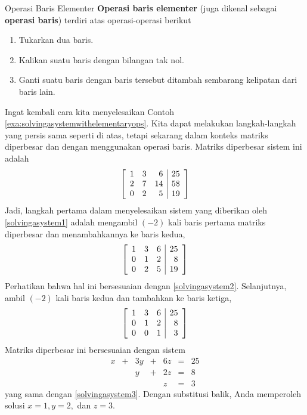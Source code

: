 \begin{definition}{Operasi Baris Elementer}\label{def:rowoperations}
\textbf{Operasi baris elementer} (juga dikenal sebagai \textbf{operasi baris}) terdiri atas operasi-operasi berikut  

\begin{enumerate}
\item Tukarkan dua baris.

\item Kalikan suatu baris dengan bilangan tak nol.

\item Ganti suatu baris dengan baris tersebut ditambah sembarang kelipatan dari baris lain.
\end{enumerate}
\end{definition}

Ingat kembali cara kita menyelesaikan Contoh \ref{exa:solvingasystemwithelementaryops}.
Kita dapat melakukan langkah-langkah yang persis sama seperti di atas, tetapi sekarang dalam konteks matriks diperbesar dan dengan menggunakan operasi baris.
Matriks diperbesar sistem ini adalah
\begin{equation*}
\left[ 
\begin{array}{rrr|r}
1 & 3 & 6 &  25 \\
2 & 7 & 14 &  58 \\
0 & 2 & 5 &  19
\end{array}
\right] 
\end{equation*}
Jadi, langkah pertama dalam
menyelesaikan sistem yang diberikan oleh \ref{solvingasystem1} adalah mengambil $\left( -2\right) $ kali baris pertama
matriks diperbesar dan menambahkannya ke baris kedua,
\begin{equation*}
\left[
\begin{array}{rrr|r}
1 & 3 & 6 & 25 \\
0 & 1 & 2 & 8 \\
0 & 2 & 5 & 19
\end{array}
\right] 
\end{equation*}
Perhatikan bahwa hal ini bersesuaian dengan \ref{solvingasystem2}. Selanjutnya, ambil $\left( -2\right) $
kali baris kedua dan tambahkan ke baris ketiga,
\begin{equation*}
\left[ 
\begin{array}{rrr|r}
1 & 3 & 6 & 25 \\
0 & 1 & 2 & 8 \\
0 & 0 & 1 & 3
\end{array}
\right]
\end{equation*}
Matriks diperbesar ini bersesuaian dengan sistem
\begin{equation*}
\begin{array}{ccccccc}
x&+&3y&+&6z&=&25 \\
&&y&+&2z&=&8 \\
&&&&z&=&3
\end{array}
\end{equation*}
yang sama dengan \ref{solvingasystem3}. Dengan substitusi balik, Anda memperoleh solusi
$x=1,y=2,$ dan $z=3.$

